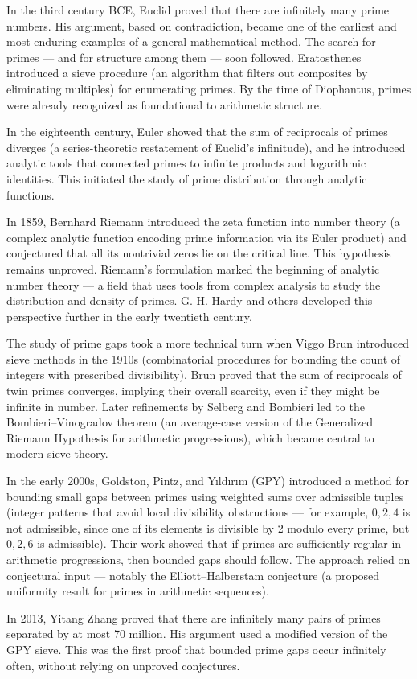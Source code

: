\begin{historical}
In the third century BCE, Euclid proved that there are infinitely many prime numbers. His argument, based on contradiction, became one of the earliest and most enduring examples of a general mathematical method. The search for primes — and for structure among them — soon followed. Eratosthenes introduced a sieve procedure (an algorithm that filters out composites by eliminating multiples) for enumerating primes. By the time of Diophantus, primes were already recognized as foundational to arithmetic structure.

In the eighteenth century, Euler showed that the sum of reciprocals of primes diverges (a series-theoretic restatement of Euclid’s infinitude), and he introduced analytic tools that connected primes to infinite products and logarithmic identities. This initiated the study of prime distribution through analytic functions.

In 1859, Bernhard Riemann introduced the zeta function into number theory (a complex analytic function encoding prime information via its Euler product) and conjectured that all its nontrivial zeros lie on the critical line. This hypothesis remains unproved. Riemann’s formulation marked the beginning of analytic number theory — a field that uses tools from complex analysis to study the distribution and density of primes. G. H. Hardy and others developed this perspective further in the early twentieth century.

The study of prime gaps took a more technical turn when Viggo Brun introduced sieve methods in the 1910s (combinatorial procedures for bounding the count of integers with prescribed divisibility). Brun proved that the sum of reciprocals of twin primes converges, implying their overall scarcity, even if they might be infinite in number. Later refinements by Selberg and Bombieri led to the Bombieri–Vinogradov theorem (an average-case version of the Generalized Riemann Hypothesis for arithmetic progressions), which became central to modern sieve theory.

In the early 2000s, Goldston, Pintz, and Yıldırım (GPY) introduced a method for bounding small gaps between primes using weighted sums over admissible tuples (integer patterns that avoid local divisibility obstructions — for example, ${0, 2, 4}$ is not admissible, since one of its elements is divisible by 2 modulo every prime, but ${0, 2, 6}$ is admissible). Their work showed that if primes are sufficiently regular in arithmetic progressions, then bounded gaps should follow. The approach relied on conjectural input — notably the Elliott–Halberstam conjecture (a proposed uniformity result for primes in arithmetic sequences).

In 2013, Yitang Zhang proved that there are infinitely many pairs of primes separated by at most 70 million. His argument used a modified version of the GPY sieve. This was the first proof that bounded prime gaps occur infinitely often, without relying on unproved conjectures.
\end{historical}
